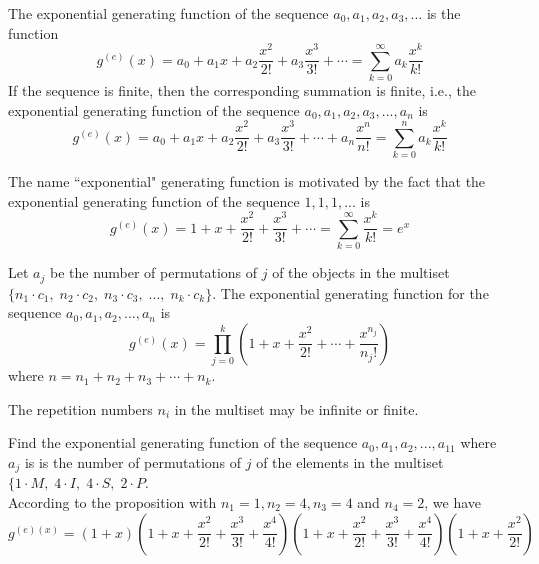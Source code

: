 \documentclass[handout]{ximera}
\begin{document}
\begin{definition}
The exponential generating function of the sequence $a_0, a_1, a_2, a_3, ...$ is the function
\[
g^{(e)}(x) = a_0 + a_1x + a_2\frac{x^2}{2!} + a_3\frac{x^3}{3!} + \cdots = \sum_{k=0}^\infty a_k \frac{x^k}{k!}
\]
If the sequence is finite, then the corresponding summation is finite, i.e., the exponential generating function of the sequence
$a_0, a_1, a_2, a_3, ..., a_n$ is
\[
g^{(e)}(x) = a_0 + a_1x + a_2\frac{x^2}{2!} + a_3\frac{x^3}{3!} + \cdots  + a_n\frac{x^n}{n!} = \sum_{k=0}^n a_k \frac{x^k}{k!}
\]
\end{definition}

\begin{remark} The name ``exponential" generating function is motivated by the fact that the exponential 
generating function of the sequence $1, 1, 1, ...$ is
\[
g^{(e)}(x) = 1 + x + \frac{x^2}{2!} + \frac{x^3}{3!} + \cdots = \sum_{k=0}^\infty \frac{x^k}{k!} = e^x
\]
\end{remark}

\begin{proposition}
Let $a_j$ be the number of permutations of $j$ of the objects in the 
multiset $\{n_1 \cdot c_1,\; n_2 \cdot c_2,\; n_3 \cdot c_3, \;...,\; n_k \cdot c_k\}$.
The exponential generating function for the sequence $a_0, a_1, a_2, ..., a_n$ 
is 
\[
g^{(e)}(x) = \prod_{j=0}^k \left(1 + x + \frac{x^2}{2!} + \cdots + \frac{x^{n_j}}{n_j !}\right)
\]
where $n = n_1 + n_2 + n_3 + \cdots + n_k$.
\end{proposition}
\begin{remark}
The repetition numbers $n_i$ in the multiset may be infinite or finite.
\end{remark}

\begin{example}[example 1] 
Find the exponential generating function of the sequence $a_0, a_1, a_2, ..., a_{11}$ where $a_j$ is is the number of 
permutations of $j$ of the elements in the multiset $\{1\cdot M,\; 4\cdot I,\; 4\cdot S,\; 2\cdot P$.\\
According to the proposition with $n_1 = 1, n_2 = 4, n_3 = 4$ and $n_4 = 2$, we have
\[
g^{(e)(x)} = \left(1+x\right)\left(1+x+\frac{x^2}{2!} + \frac{x^3}{3!} + \frac{x^4}{4!}\right)
\left(1+x+\frac{x^2}{2!} + \frac{x^3}{3!} + \frac{x^4}{4!}\right)
\left(1+x+\frac{x^2}{2!}\right)
\]
\end{example}
\end{document}
